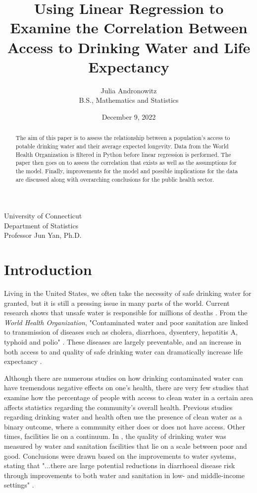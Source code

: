 \documentclass[12pt]{article}
\title{Using Linear Regression to Examine the Correlation Between Access to Drinking Water and Life Expectancy}
\author{Julia Andronowitz\\B.S., Mathematics and Statistics}
\date{December 9, 2022}
\begin{document}
\maketitle
\thispagestyle{empty}

\begin{abstract}

The aim of this paper is to assess the relationship between a population's access to potable drinking water and their average expected longevity. Data from the World Health Organization is filtered in Python before linear regression is performed. The paper then goes on to assess the correlation that exists as well as the assumptions for the model. Finally, improvements for the model and possible implications for the data are discussed along with overarching conclusions for the public health sector.

\end{abstract}

\vfill

\begin{center}
    University of Connecticut \\ Department of Statistics \\ Professor Jun Yan, Ph.D.
\end{center}

\section{Introduction}

Living in the United States, we often take the necessity of safe drinking water for granted, but it is still a pressing issue in many parts of the world. Current research shows that unsafe water is responsible for millions of deaths \citep{ritchieroser2019water}. From the \textit{World Health Organization}, "Contaminated water and poor sanitation are linked to transmission of diseases such as cholera, diarrhoea, dysentery, hepatitis A, typhoid and polio" \citep{who2017water}. These diseases are largely preventable, and an increase in both access to and quality of safe drinking water can dramatically increase life expectancy \citep{angelakis2021quality}.

Although there are numerous studies on how drinking contaminated water can have tremendous negative effects on one's health, there are very few studies that examine how the percentage of people with access to clean water in a certain area affects statistics regarding the community's overall health. Previous studies regarding drinking water and health often use the presence of clean water as a binary outcome, where a community either does or does not have access. Other times, facilities lie on a continuum. In \citet{wolf2014sanitationondisease}, the quality of drinking water was measured by water and sanitation facilities that lie on a scale between poor and good. Conclusions were drawn based on the improvements to water systems, stating that "...there are large potential reductions in diarrhoeal disease risk through improvements to both water and sanitation in low- and middle-income settings" \citep{wolf2014sanitationondisease}.
\end{document}
